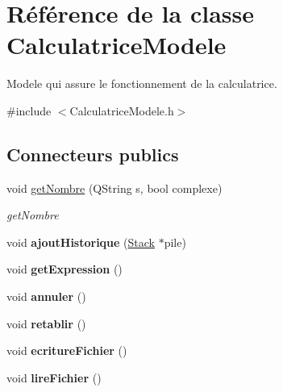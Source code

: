 \hypertarget{class_calculatrice_modele}{\section{Référence de la classe Calculatrice\-Modele}
\label{class_calculatrice_modele}
}


Modele qui assure le fonctionnement de la calculatrice.  




{\ttfamily \#include $<$Calculatrice\-Modele.\-h$>$}

\subsection*{Connecteurs publics}
\begin{DoxyCompactItemize}
\item 
void \hyperlink{class_calculatrice_modele_a2214a44a1baedaaa580520967595b224}{get\-Nombre} (Q\-String s, bool complexe)
\begin{DoxyCompactList}\small\item\em get\-Nombre \end{DoxyCompactList}\item 
\hypertarget{class_calculatrice_modele_aaaa8b6025095b0674a9244c197351cbc}{void {\bfseries ajout\-Historique} (\hyperlink{class_stack}{Stack} $\ast$pile)}\label{class_calculatrice_modele_aaaa8b6025095b0674a9244c197351cbc}

\item 
\hypertarget{class_calculatrice_modele_a381382f5fb175a17915a057009051d4a}{void {\bfseries get\-Expression} ()}\label{class_calculatrice_modele_a381382f5fb175a17915a057009051d4a}

\item 
\hypertarget{class_calculatrice_modele_a137a2699492e9989c74d1eb04c12cd5c}{void {\bfseries annuler} ()}\label{class_calculatrice_modele_a137a2699492e9989c74d1eb04c12cd5c}

\item 
\hypertarget{class_calculatrice_modele_a3ed52da71ebf6915d1efa1700fc7cc5c}{void {\bfseries retablir} ()}\label{class_calculatrice_modele_a3ed52da71ebf6915d1efa1700fc7cc5c}

\item 
\hypertarget{class_calculatrice_modele_a1e6e7fda54228e00a4a7adb17d72c0f3}{void {\bfseries ecriture\-Fichier} ()}\label{class_calculatrice_modele_a1e6e7fda54228e00a4a7adb17d72c0f3}

\item 
\hypertarget{class_calculatrice_modele_a88a694abc7df76ef3dc4beded566821f}{void {\bfseries lire\-Fichier} ()}\label{class_calculatrice_modele_a88a694abc7df76ef3dc4beded566821f}


\end{DoxyCompactItemize}
